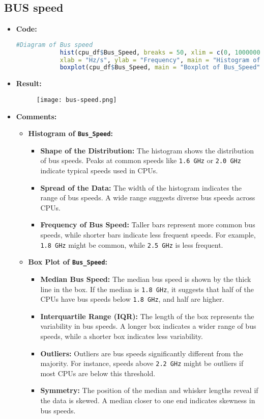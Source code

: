 \documentclass{article}
\begin{document}
	\subsection{BUS speed}
	\begin{itemize}
		\item \textbf{Code:}
		\begin{lstlisting}[basicstyle=\ttfamily, frame=single,language=R]
			#Diagram of Bus speed
			hist(cpu_df$Bus_Speed, breaks = 50, xlim = c(0, 10000000000), ylim = c(0, 1000), 
			xlab = "Hz/s", ylab = "Frequency", main = "Histogram of Bus_Speed")
			boxplot(cpu_df$Bus_Speed, main = "Boxplot of Bus_Speed")
		\end{lstlisting}
		\item \textbf{Result:}
		\begin{figure}[h]
			\centering
			\texttt{[image: bus-speed.png]}  %
			\label{fig:enter-label}
		\end{figure}
		\item \textbf{Comments:}
		\begin{itemize}
			\item \textbf{Histogram of \texttt{Bus\_Speed}:}
			\begin{itemize}
				\item \textbf{Shape of the Distribution:} The histogram shows the distribution of bus speeds. Peaks at common speeds like \texttt{1.6 GHz} or \texttt{2.0 GHz} indicate typical speeds used in CPUs.
				\item \textbf{Spread of the Data:} The width of the histogram indicates the range of bus speeds. A wide range suggests diverse bus speeds across CPUs.
				\item \textbf{Frequency of Bus Speed:} Taller bars represent more common bus speeds, while shorter bars indicate less frequent speeds. For example, \texttt{1.8 GHz} might be common, while \texttt{2.5 GHz} is less frequent.
			\end{itemize}
			\item \textbf{Box Plot of \texttt{Bus\_Speed}:}
			\begin{itemize}
				\item \textbf{Median Bus Speed:} The median bus speed is shown by the thick line in the box. If the median is \texttt{1.8 GHz}, it suggests that half of the CPUs have bus speeds below \texttt{1.8 GHz}, and half are higher.
				\item \textbf{Interquartile Range (IQR):} The length of the box represents the variability in bus speeds. A longer box indicates a wider range of bus speeds, while a shorter box indicates less variability.
				\item \textbf{Outliers:} Outliers are bus speeds significantly different from the majority. For instance, speeds above \texttt{2.2 GHz} might be outliers if most CPUs are below this threshold.
				\item \textbf{Symmetry:} The position of the median and whisker lengths reveal if the data is skewed. A median closer to one end indicates skewness in bus speeds.
			\end{itemize}
		\end{itemize}
	\end{itemize}
\end{document}
